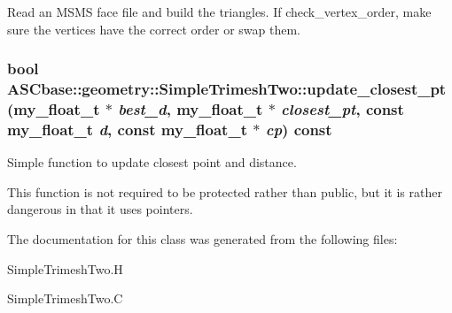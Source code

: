 Read an MSMS face file and build the triangles. If check\_\-vertex\_\-order, make sure the vertices have the correct order or swap them. 
\subsubsection{\setlength{\rightskip}{0pt plus 5cm}bool ASCbase::geometry::Simple\-Trimesh\-Two::update\_\-closest\_\-pt (my\_\-float\_\-t $\ast$ {\em best\_\-d}, my\_\-float\_\-t $\ast$ {\em closest\_\-pt}, const my\_\-float\_\-t {\em d}, const my\_\-float\_\-t $\ast$ {\em cp}) const\hspace{0.3cm}{\tt  [inline, protected]}}\label{classASCbase_1_1geometry_1_1SimpleTrimeshTwo_2112115ad368fa95eda1bfd1bc585674}


Simple function to update closest point and distance. 

This function is not required to be protected rather than public, but it is rather dangerous in that it uses pointers. 

The documentation for this class was generated from the following files:\begin{CompactItemize}
\item 
Simple\-Trimesh\-Two.H\item 
Simple\-Trimesh\-Two.C\end{CompactItemize}
